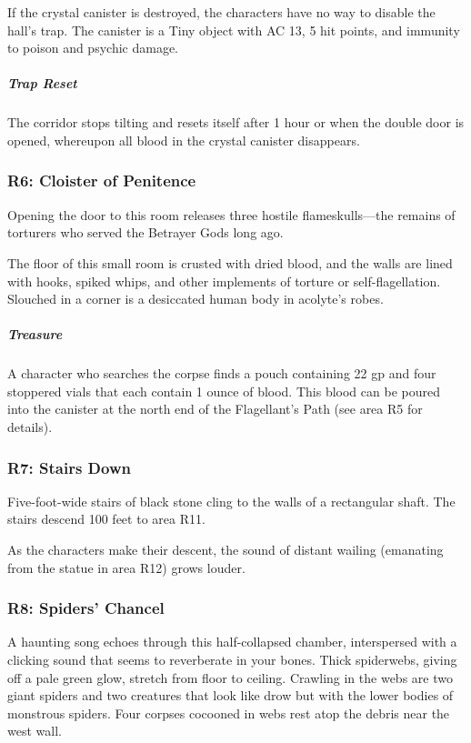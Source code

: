 \documentclass[10pt,a4paper,twoside,fancy,bg=print,twocolumn,openany,nodeprecatedcode]{dndbook}
\begin{document}
If the crystal canister is destroyed, the characters have no way to disable the hall's trap. The canister is a Tiny object with AC 13, 5 hit points, and immunity to poison and psychic damage.

\subparagraph{Trap Reset}
The corridor stops tilting and resets itself after 1 hour or when the double door is opened, whereupon all blood in the crystal canister disappears.

\subsubsection{R6: Cloister of Penitence}
Opening the door to this room releases three hostile flameskulls—the remains of torturers who served the Betrayer Gods long ago.

\begin{DndReadAloud}{}
The floor of this small room is crusted with dried blood, and the walls are lined with hooks, spiked whips, and other implements of torture or self-flagellation. Slouched in a corner is a desiccated human body in acolyte's robes.

\end{DndReadAloud}

\subparagraph{Treasure}
A character who searches the corpse finds a pouch containing 22 gp and four stoppered vials that each contain 1 ounce of blood. This blood can be poured into the canister at the north end of the Flagellant's Path (see area R5 for details).

\subsubsection{R7: Stairs Down}
Five-foot-wide stairs of black stone cling to the walls of a rectangular shaft. The stairs descend 100 feet to area R11.

As the characters make their descent, the sound of distant wailing (emanating from the statue in area R12) grows louder.

\subsubsection{R8: Spiders' Chancel}
\begin{DndReadAloud}{}
A haunting song echoes through this half-collapsed chamber, interspersed with a clicking sound that seems to reverberate in your bones. Thick spiderwebs, giving off a pale green glow, stretch from floor to ceiling. Crawling in the webs are two giant spiders and two creatures that look like drow but with the lower bodies of monstrous spiders. Four corpses cocooned in webs rest atop the debris near the west wall.

\end{DndReadAloud}
\end{document}

